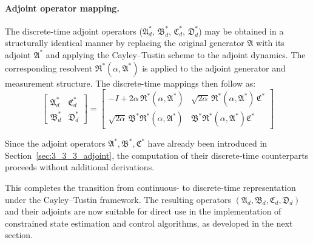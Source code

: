 \paragraph{Adjoint operator mapping.}  
The discrete-time adjoint operators ($\mathfrak{A}_d^*$, $\mathfrak{B}_d^*$, $\mathfrak{C}_d^*$, $\mathfrak{D}_d^*$) may be obtained in a structurally identical manner by replacing the original generator $\mathfrak{A}$ with its adjoint $\mathfrak{A}^*$ and applying the Cayley--Tustin scheme to the adjoint dynamics. The corresponding resolvent $\mathfrak{R}^*(\alpha, \mathfrak{A}^*)$ is applied to the adjoint generator and measurement structure. The discrete-time mappings then follow as:
\begin{equation}
\begin{bmatrix}
\mathfrak{A}_d^* & \mathfrak{C}_d^* \\
\mathfrak{B}_d^* & \mathfrak{D}_d^*
\end{bmatrix}
=
\begin{bmatrix}
-I + 2\alpha\, \mathfrak{R}^*(\alpha, \mathfrak{A}^*) & \sqrt{2\alpha}\, \mathfrak{R}^*(\alpha, \mathfrak{A}^*)\, \mathfrak{C}^* \\
\sqrt{2\alpha}\, \mathfrak{B}^* \mathfrak{R}^*(\alpha, \mathfrak{A}^*) & \mathfrak{B}^* \mathfrak{R}^*(\alpha, \mathfrak{A}^*) \mathfrak{C}^*
\end{bmatrix}
\end{equation}

Since the adjoint operators $\mathfrak{A}^*, \mathfrak{B}^*, \mathfrak{C}^*$ have already been introduced in Section~\ref{sec:3_3_3_adjoint}, the computation of their discrete-time counterparts proceeds without additional derivations.

This completes the transition from continuous- to discrete-time representation under the Cayley--Tustin framework. The resulting operators $(\mathfrak{A}_d, \mathfrak{B}_d, \mathfrak{C}_d, \mathfrak{D}_d)$ and their adjoints are now suitable for direct use in the implementation of constrained state estimation and control algorithms, as developed in the next section.
